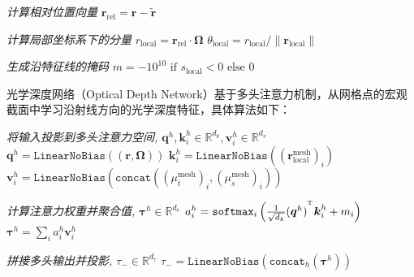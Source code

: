 \begin{algorithm}[htp!]
    \caption{相对位置编码（Relative Position Encoding）}\label{alg:code-relative-position-encoding}
    \SetAlgoLined

    \emph{计算相对位置向量}\;
    $\boldsymbol{r}_{\text{rel}} = \boldsymbol{r} - \tilde{\boldsymbol{r}}$\;

    \emph{计算局部坐标系下的分量}\;
    $r_{\text{local}} =  \boldsymbol{r}_{\text{rel}} \cdot \boldsymbol{\Omega}$\;
    $\theta_{\text{local}} = r_{\text{local}}/\|\boldsymbol{r}_{\text{local}}\|$\;

    \emph{生成沿特征线的掩码}\;
    $m = -10^{10} \text{ if } s_\text{local} < 0 \text{ else } 0$\;

    \;
\end{algorithm}

光学深度网络（Optical Depth Network）基于多头注意力机制，从网格点的宏观截面中学习沿射线方向的光学深度特征，具体算法如下：

\begin{algorithm}[htp!]
    \caption{光学深度网络（Optical Depth Network）}\label{alg:code-optical-depth-net}
    \SetAlgoLined
    \KwOut{$\tau_{-}$}

    \emph{将输入投影到多头注意力空间, $\boldsymbol{q}^h, \boldsymbol{k}_i^h \in \mathbb{R}^{d_k}, \boldsymbol{v}_i^h \in \mathbb{R}^{d_v}$}\;
    $\boldsymbol{q}^h = \texttt{LinearNoBias}((\boldsymbol{r},\boldsymbol{\Omega}))$\;
    $\boldsymbol{k}_i^h = \texttt{LinearNoBias}\left({(\boldsymbol{r}^\text{mesh}_{\text{local}})}_i\right)$\;
    $\boldsymbol{v}_i^h = \texttt{LinearNoBias}\left(\texttt{concat}\left({(\mu_t^{\text{mesh}})}_i,{(\mu_s^{\text{mesh}})}_i\right)\right)$\;

    \emph{计算注意力权重并聚合值, $\boldsymbol{\tau}^h\in\mathbb{R}^{d_v}$}\;
    $a_{i}^h = \texttt{softmax}_i\left(\frac{1}{\sqrt{d_k}}{(\boldsymbol{q}^h)}^{^{\operatorname{T}}}\boldsymbol{k}_i^h+m_i\right)$\;
    $\boldsymbol{\tau}^h = \sum_i a_{i}^h \boldsymbol{v}_i^h$\;

    \emph{拼接多头输出并投影, $\tau_{-}\in \mathbb{R}^{d_\tau}$}\;
    $\tau_{-} = \texttt{LinearNoBias}\left(\texttt{concat}_h(\boldsymbol{\tau}^h)\right)$\;

    \Return{$\tau_{-}$}\;
\end{algorithm}

